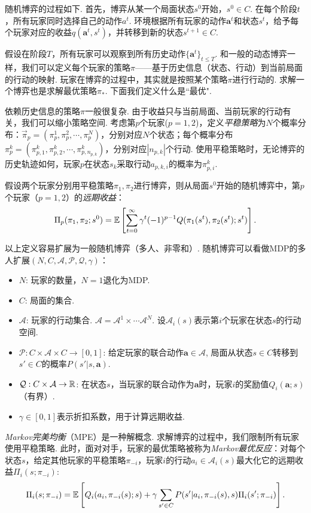 随机博弈的过程如下. 首先，博弈从某一个局面状态$s^0$开始，$s^0\in C$. 在每个阶段$t$，所有玩家同时选择自己的动作$a^t$. 环境根据所有玩家的动作$\boldsymbol a^t$和状态$s^t$，给予每个玩家对应的收益$q(\boldsymbol a^t, s^t)$，并转移到新的状态$s^{t+1}\in C$. 

假设在阶段$T$，所有玩家可以观察到所有历史动作$\{\boldsymbol a^t\}_{t\le T}$. 和一般的动态博弈一样，我们可以定义每个玩家的策略$\pi$——基于历史信息（状态、行动）到当前局面的行动的映射. 玩家在博弈的过程中，其实就是按照某个策略$\pi$进行行动的. 求解一个博弈也是求解最优策略$\pi_*$. 下面我们定义什么是``最优".

依赖历史信息的策略$\pi$一般很复杂. 由于收益只与当前局面、当前玩家的行动有关，我们可以缩小策略空间. 考虑第$p$个玩家($p=1,2$)，定义\emph{平稳策略}为$N$个概率分布：$\vec \pi_p=(\pi_p^1,\pi_p^2,\cdots,\pi_p^N)$，分别对应$N$个状态；每个概率分布$\pi_p^k=(\pi_{p,1}^k,\pi_{p,2}^k,\cdots,\pi_{p,n_{p,k}}^k)$，分别对应$|n_{p,k}|$个行动. 使用平稳策略时，无论博弈的历史轨迹如何，玩家$p$在状态$s_k$采取行动$a_{p,k,i}$的概率为$\pi_{p,i}^k$.

假设两个玩家分别用平稳策略$\pi_1,\pi_2$进行博弈，则从局面$s^0$开始的随机博弈中，第$p$个玩家（$p=1,2$）的\emph{远期收益}：
        \[\Pi_p(\pi_1,\pi_2; s^0) = \mathbb{E}\left[\sum_{t=0}^\infty \gamma^t(-1)^{p-1} Q(\pi_1(s^t),\pi_2(s^t); {s^t}) \right].\]

以上定义容易扩展为一般随机博弈（多人、非零和）. 随机博弈可以看做MDP的多人扩展$(N, C, \mathcal A, \mathcal P,\mathcal Q, \gamma)$：
\begin{itemize}
    \item $N$: 玩家的数量，$N=1$退化为MDP.
    \item $C$: 局面的集合.
    \item $\mathcal A$: 玩家的行动集合. $\mathcal A=\mathcal A^1\times \cdots\mathcal A^N$. 设$\mathcal A_i(s)$表示第$i$个玩家在状态$s$的行动空间.
    \item $\mathcal P: C\times \mathcal A\times C\to [0,1]$: 给定玩家的联合动作$\boldsymbol a\in\mathcal A$, 局面从状态$s\in C$转移到$s'\in C$的概率$P(s'|s,\boldsymbol a)$.
    \item $\mathcal Q: C\times \mathcal A\to \mathbb{R}$: 在状态$s$，当玩家的联合动作为$\boldsymbol a$时，玩家$i$的奖励值$Q_i(\boldsymbol a;s)$（有界）. 
    \item $\gamma\in[0,1]$表示折扣系数，用于计算远期收益.
\end{itemize}

\emph{Markov完美均衡}（MPE）是一种解概念. 求解博弈的过程中，我们限制所有玩家使用平稳策略. 此时，面对对手，玩家的最优策略被称为\emph{Markov最优反应}：对每个状态$s$，给定其他玩家的平稳策略$\pi_{-i}$，玩家$i$的行动$a_i\in \mathcal A_i(s)$最大化它的远期收益$\Pi_i(s;\pi_{-i})$:
    \[\Pi_i(s;\pi_{-i}) = \mathbb{E}\left[Q_i(a_i,\pi_{-i}(s);s) + \gamma\sum_{s'\in C} P(s'|a_i,\pi_{-i}(s),s)\Pi_i(s';\pi_{-i}) \right].\]

